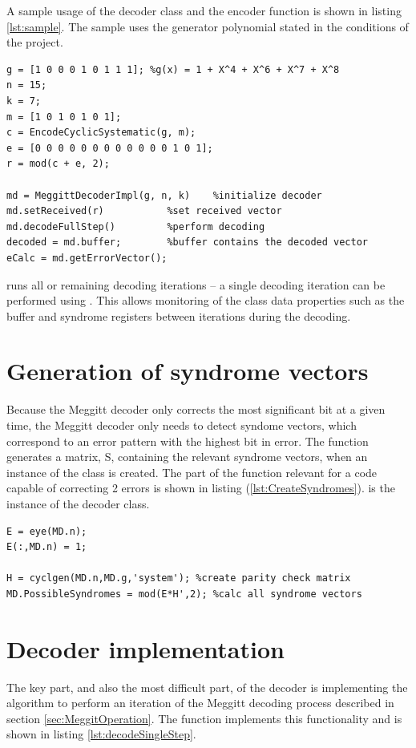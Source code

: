 \documentclass[Main]{subfiles}
\begin{document}
A sample usage of the decoder class and the encoder function is shown in listing \ref{lst:sample}. The sample uses the generator polynomial stated in the conditions of the project.
\begin{lstlisting}[label={lst:sample},captionpos=b, caption=Sample usage of the decoder.] 
%setup
g = [1 0 0 0 1 0 1 1 1]; %g(x) = 1 + X^4 + X^6 + X^7 + X^8
n = 15;
k = 7;
m = [1 0 1 0 1 0 1];
c = EncodeCyclicSystematic(g, m);
e = [0 0 0 0 0 0 0 0 0 0 0 0 1 0 1];
r = mod(c + e, 2);

md = MeggittDecoderImpl(g, n, k)	%initialize decoder
md.setReceived(r)			%set received vector
md.decodeFullStep()			%perform decoding
decoded = md.buffer;		%buffer contains the decoded vector
eCalc = md.getErrorVector();
\end{lstlisting}

 runs all or remaining decoding iterations -- a single decoding iteration can be performed using . This allows monitoring of the class data properties such as the buffer and syndrome registers between iterations during the decoding.

\section{Generation of syndrome vectors}
Because the Meggitt decoder only corrects the most significant bit at a given time, the Meggitt decoder only needs to detect syndome vectors, which correspond to an error pattern with the highest bit in error. The function  generates a matrix, S, containing the relevant syndrome vectors, when an instance of the  class is created. The part of the function relevant for a code capable of correcting 2 errors is shown in listing (\ref{lst:CreateSyndromes}).  is the instance of the decoder class.

\begin{lstlisting}[label={lst:CreateSyndromes},captionpos=b, caption=Creating possible syndrome vectors.] 
%create 2 bit error patterns with highest bit in error
E = eye(MD.n);
E(:,MD.n) = 1;

H = cyclgen(MD.n,MD.g,'system'); %create parity check matrix
MD.PossibleSyndromes = mod(E*H',2); %calc all syndrome vectors
\end{lstlisting}

\section{Decoder implementation} \label{sec:decoderImpl}
The key part, and also the most difficult part, of the decoder is implementing the algorithm to perform an iteration of the Meggitt decoding process described in section \ref{sec:MeggitOperation}. The function  implements this functionality and is shown in listing \ref{lst:decodeSingleStep}.
\end{document}
